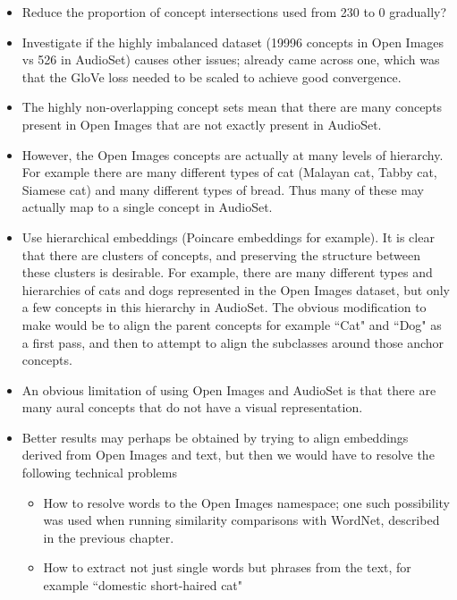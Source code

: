 \begin{itemize}
    \item Reduce the proportion of concept intersections used from 230 to 0 gradually?
    \item Investigate if the highly imbalanced dataset (19996 concepts in Open Images vs 526 in AudioSet) causes other issues; already came across one, which was that the GloVe loss needed to be scaled to achieve good convergence. 
    \item The highly non-overlapping concept sets mean that there are many concepts present in Open Images that are not exactly present in AudioSet.
    \item However, the Open Images concepts are actually at many levels of hierarchy. For example there are many different types of cat (Malayan cat, Tabby cat, Siamese cat) and many different types of bread. Thus many of these may actually map to a single concept in AudioSet. 
    \item Use hierarchical embeddings (Poincare embeddings for example). It is clear that there are clusters of concepts, and preserving the structure between these clusters is desirable. For example, there are many different types and hierarchies of cats and dogs represented in the Open Images dataset, but only a few concepts in this hierarchy in AudioSet. The obvious modification to make would be to align the parent concepts for example ``Cat" and ``Dog" as a first pass, and then to attempt to align the subclasses around those anchor concepts. 
    \item An obvious limitation of using Open Images and AudioSet is that there are many aural concepts that do not have a visual representation. 
    \item Better results may perhaps be obtained by trying to align embeddings derived from Open Images and text, but then we would have to resolve the following technical problems
    \begin{itemize}
        \item How to resolve words to the Open Images namespace; one such possibility was used when running similarity comparisons with WordNet, described in the previous chapter. 
        \item How to extract not just single words but phrases from the text, for example ``domestic short-haired cat"
    \end{itemize}
\end{itemize}


